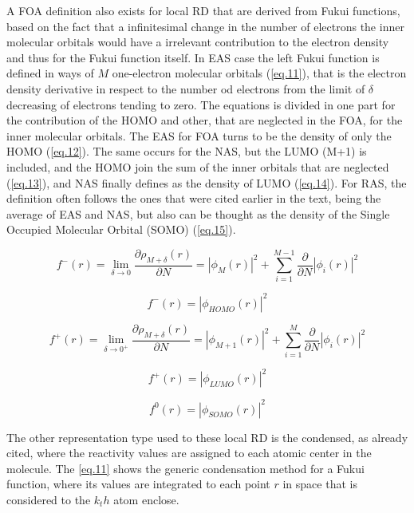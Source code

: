 \documentclass[a4paper,11pt]{refart}
\begin{document}
A FOA definition also exists for local RD that are derived from Fukui functions, based on the fact that a infinitesimal change in the number of electrons the inner molecular orbitals would have a irrelevant contribution to the electron density and thus for the Fukui function itself. In EAS case the left Fukui function is defined in ways of $M$ one-electron molecular orbitals (\autoref{eq.11}), that is the electron density derivative in respect to the number od electrons from the limit of $\delta$ decreasing of electrons tending to zero. The equations is divided in one part for the contribution of the HOMO and other, that are neglected in the FOA, for the inner molecular orbitals. The EAS for FOA turns to be the density of only the HOMO (\autoref{eq.12}). The same occurs for the NAS, but the LUMO (M+1) is included, and the HOMO join the sum of the inner orbitals that are neglected (\autoref{eq.13}), and NAS finally defines as the density of LUMO (\autoref{eq.14}).  For RAS, the definition often follows the ones that were cited earlier in the text, being the average of EAS and NAS, but also can be thought as the density of the Single Occupied Molecular Orbital (SOMO) (\autoref{eq.15}).

\begin{equation}
f^{-}(r) = \lim_{\delta \to 0} \frac{\partial \rho_{M+\delta}(r)}{\partial N} = |\phi_{M}(r)|^2  +\sum_{i=1}^{M-1} \frac{\partial}{\partial N} |\phi_i(r)|^2
\label{eq.11}
\end{equation}

\begin{equation}
f^{-}(r) = |\phi_{HOMO}(r)|^2 
\label{eq.12}
\end{equation}

\begin{equation}
f^{+}(r) = \lim_{\delta \to 0^+} \frac{\partial \rho_{M+\delta}(r)}{\partial N}	 =  |\phi_{M+1}(r)|^2 		 + \sum_{i=1}^{M} \frac{\partial}{\partial N} |\phi_i(r)|^2
\label{eq.13}
\end{equation}

\begin{equation}
f^{+}(r) = |\phi_{LUMO}(r)|^2 
\label{eq.14}
\end{equation}

\begin{equation}
f^{0}(r) = |\phi_{SOMO}(r)|^2 
\label{eq.15}
\end{equation}

The other representation type used to these local RD is the condensed, as already cited, where the reactivity values are assigned to each atomic center in the molecule. The \autoref{eq.11} shows the generic condensation method for a Fukui function, where its values are integrated to each point $r$ in space that is considered to the $k_th$ atom enclose.  
\end{document}
